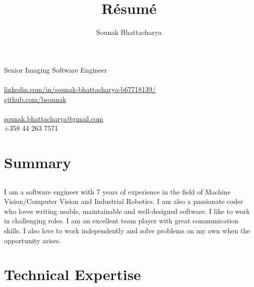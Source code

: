 \documentclass{article}
\renewcommand{\maketitle}{
\begin{center}
{\huge\bfseries
\theauthor}

\end{center}
}
\begin{document}
\title{R\'esum\'e}
\author{Sounak Bhattacharya}

\maketitle

\begin{center}
{\Large Senior Imaging Software Engineer}\\~\\
\href{https://www.linkedin.com/in/sounak-bhattacharya-b67718139/}{linkedin.com/in/sounak-bhattacharya-b67718139/}\\
\href{https://github.com/bsounak}{github.com/bsounak}\\~\\
\href{mailto:sounak.bhattacharya@gmail.com}{sounak.bhattacharya@gmail.com}\\
+358 44 263 7571
\end{center}

\section{Summary}
\subsection{}
I am a software engineer with 7 years of experience in the field of Machine
Vision/Computer Vision and Industrial Robotics. I am also a passionate coder
who loves writing usable, maintainable and well-designed software. I like to
work in challenging roles. I am an excellent team player with great
communication skills. I also love to work independently and solve problems on
my own when the opportunity arises.
\subsection{}

\section{Technical Expertise}
\end{document}
